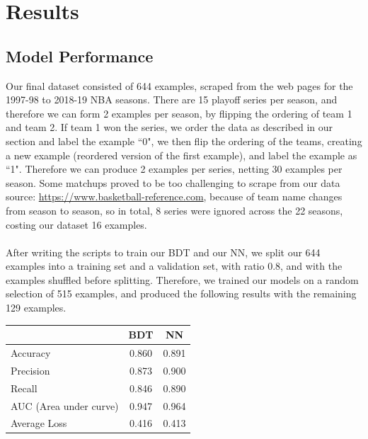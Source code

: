 \documentclass[letterpaper]{article} %
\begin{document}

\section{Results}

\subsection{Model Performance}

Our final dataset consisted of 644 examples, scraped from the web pages for the 1997-98 to 2018-19 NBA seasons. There are 15 playoff series per season, and therefore we can form 2 examples per season, by flipping the ordering of team 1 and team 2. If team 1 won the series, we order the data as described in our  section and label the example ``0", we then flip the ordering of the teams, creating a new example (reordered version of the first example), and label the example as ``1". Therefore we can produce 2 examples per series, netting 30 examples per season. Some matchups proved to be too challenging to scrape from our data source: \href{https://www.basketball-reference.com}{https://www.basketball-reference.com}, because of team name changes from season to season, so in total, 8 series were ignored across the 22 seasons, costing our dataset 16 examples. \\ \\
After writing the scripts to train our BDT and our NN, we split our 644 examples into a training set and a validation set, with ratio 0.8, and with the examples shuffled before splitting. Therefore, we trained our models on a random selection of 515 examples, and produced the following results with the remaining 129 examples.
\begin{center}
\begin{tabular}{|l|c|c|} \hline
& BDT & NN \\ \hline
Accuracy & 0.860 & 0.891 \\ \hline
Precision & 0.873 & 0.900 \\ \hline
Recall & 0.846 & 0.890 \\ \hline
AUC (Area under curve) & 0.947 & 0.964 \\ \hline
Average Loss & 0.416 & 0.413 \\ \hline
\end{tabular}
\end{center}
\end{document}
